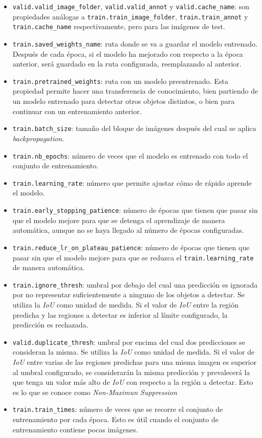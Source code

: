 \begin{itemize}
	\item \texttt{valid.valid\_image\_folder}, \texttt{valid.valid\_annot} y \texttt{valid.cache\_name}: son propiedades análogas a \texttt{train.train\_image\_folder}, \texttt{train.train\_annot} y \texttt{train.cache\_name} respectivamente, pero para las imágenes de test.
	\item \texttt{train.saved\_weights\_name}: ruta donde se va a guardar el modelo entrenado. Después de cada época, si el modelo ha mejorado con respecto a la época anterior, será guardado en la ruta configurada, reemplazando al anterior.
	\item \texttt{train.pretrained\_weights}: ruta con un modelo preentrenado. Esta propiedad permite hacer una transferencia de conocimiento, bien partiendo de un modelo entrenado para detectar otros objetos distintos, o bien para continuar con un entrenamiento anterior.
	\item \texttt{train.batch\_size}: tamaño del bloque de imágenes después del cual se aplica \textit{backpropagation}.
	\item \texttt{train.nb\_epochs}: número de veces que el modelo es entrenado con todo el conjunto de entrenamiento.
	\item \texttt{train.learning\_rate}: número que permite ajustar cómo de rápido aprende el modelo.
	\item \texttt{train.early\_stopping\_patience}: número de épocas que tienen que pasar sin que el modelo mejore para que se detenga el aprendizaje de manera automática, aunque no se haya llegado al número de épocas configuradas.
	\item \texttt{train.reduce\_lr\_on\_plateau\_patience}: número de épocas que tienen que pasar sin que el modelo mejore para que se reduzca el \texttt{train.learning\_rate} de manera automática.
	\item \texttt{train.ignore\_thresh}: umbral por debajo del cual una predicción es ignorada por no representar suficientemente a ninguno de los objetos a detectar. Se utiliza la \textit{IoU} como unidad de medida. Si el valor de \textit{IoU} entre la región predicha y las regiones a detectar es inferior al límite configurado, la predicción es rechazada.
	\item \texttt{valid.duplicate\_thresh}: umbral por encima del cual dos predicciones se consideran la misma. Se utiliza la \textit{IoU} como unidad de medida. Si el valor de \textit{IoU} entre varias de las regiones predichas para una misma imagen es superior al umbral configurado, se considerarán la misma predicción y prevalecerá la que tenga un valor más alto de \textit{IoU} con respecto a la región a detectar. Esto es lo que se conoce como \textit{Non-Maximun Suppression} \cite{s6_nonmaximunsuppression}
	\item \texttt{train.train\_times}: número de veces que se recorre el conjunto de entrenamiento por cada época. Esto es útil cuando el conjunto de entrenamiento contiene pocas imágenes.
\end{itemize}

